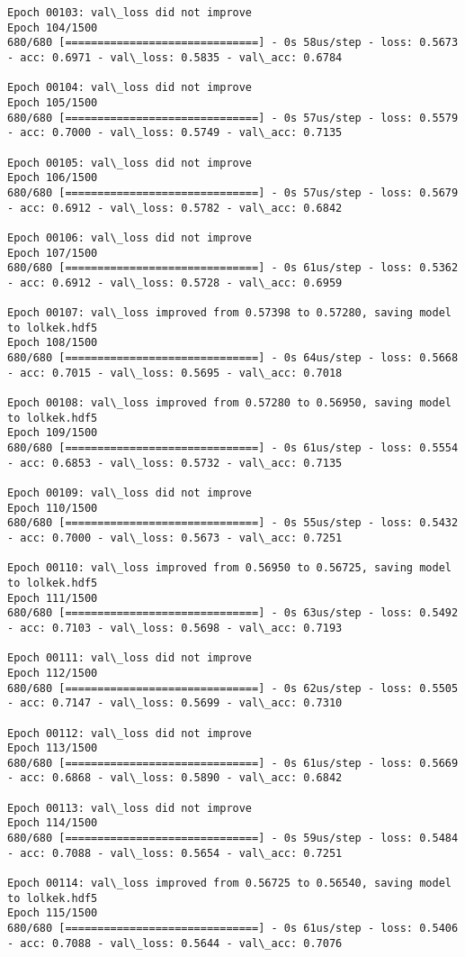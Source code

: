 \documentclass[11pt]{article}
\begin{document}
\begin{Verbatim}[commandchars=\\\{\}]
Epoch 00103: val\_loss did not improve
Epoch 104/1500
680/680 [==============================] - 0s 58us/step - loss: 0.5673 - acc: 0.6971 - val\_loss: 0.5835 - val\_acc: 0.6784

Epoch 00104: val\_loss did not improve
Epoch 105/1500
680/680 [==============================] - 0s 57us/step - loss: 0.5579 - acc: 0.7000 - val\_loss: 0.5749 - val\_acc: 0.7135

Epoch 00105: val\_loss did not improve
Epoch 106/1500
680/680 [==============================] - 0s 57us/step - loss: 0.5679 - acc: 0.6912 - val\_loss: 0.5782 - val\_acc: 0.6842

Epoch 00106: val\_loss did not improve
Epoch 107/1500
680/680 [==============================] - 0s 61us/step - loss: 0.5362 - acc: 0.6912 - val\_loss: 0.5728 - val\_acc: 0.6959

Epoch 00107: val\_loss improved from 0.57398 to 0.57280, saving model to lolkek.hdf5
Epoch 108/1500
680/680 [==============================] - 0s 64us/step - loss: 0.5668 - acc: 0.7015 - val\_loss: 0.5695 - val\_acc: 0.7018

Epoch 00108: val\_loss improved from 0.57280 to 0.56950, saving model to lolkek.hdf5
Epoch 109/1500
680/680 [==============================] - 0s 61us/step - loss: 0.5554 - acc: 0.6853 - val\_loss: 0.5732 - val\_acc: 0.7135

Epoch 00109: val\_loss did not improve
Epoch 110/1500
680/680 [==============================] - 0s 55us/step - loss: 0.5432 - acc: 0.7000 - val\_loss: 0.5673 - val\_acc: 0.7251

Epoch 00110: val\_loss improved from 0.56950 to 0.56725, saving model to lolkek.hdf5
Epoch 111/1500
680/680 [==============================] - 0s 63us/step - loss: 0.5492 - acc: 0.7103 - val\_loss: 0.5698 - val\_acc: 0.7193

Epoch 00111: val\_loss did not improve
Epoch 112/1500
680/680 [==============================] - 0s 62us/step - loss: 0.5505 - acc: 0.7147 - val\_loss: 0.5699 - val\_acc: 0.7310

Epoch 00112: val\_loss did not improve
Epoch 113/1500
680/680 [==============================] - 0s 61us/step - loss: 0.5669 - acc: 0.6868 - val\_loss: 0.5890 - val\_acc: 0.6842

Epoch 00113: val\_loss did not improve
Epoch 114/1500
680/680 [==============================] - 0s 59us/step - loss: 0.5484 - acc: 0.7088 - val\_loss: 0.5654 - val\_acc: 0.7251

Epoch 00114: val\_loss improved from 0.56725 to 0.56540, saving model to lolkek.hdf5
Epoch 115/1500
680/680 [==============================] - 0s 61us/step - loss: 0.5406 - acc: 0.7088 - val\_loss: 0.5644 - val\_acc: 0.7076


\end{Verbatim}
\end{document}
